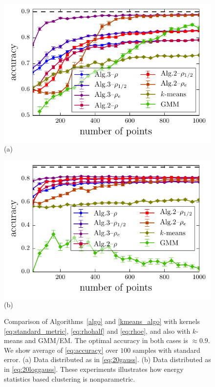 \documentclass[aps,preprint,nofootinbib,floatfix]{revtex4-1}
\begin{document}
\begin{figure}
\begin{minipage}{0.49\textwidth}
\centering
\includegraphics[width=1\textwidth]{gauss.pdf}\\[-1.0em]
(a)
\end{minipage}
\begin{minipage}{0.49\textwidth}
\centering
\includegraphics[width=1\textwidth]{loggauss.pdf}\\[-1.0em]
(b)
\end{minipage}
\caption{
\label{fig:consist}
Comparison of Algorithms~\ref{algo} and \ref{kmeans_algo} with kernels
\eqref{eq:standard_metric}, \eqref{eq:rhohalf} and \eqref{eq:rhoe}, and
also with $k$-means and GMM/EM. The optimal accuracy in both cases
is $\approx 0.9$. We show average of \eqref{eq:accuracy}
over $100$ samples with standard error.
(a) Data distributed as in 
\eqref{eq:20gauss}. 
(b) Data distributed as in \eqref{eq:20loggauss}.
These experiments illustrates how energy statistics
based clustering is nonparametric.
}
\end{figure}
\end{document}
